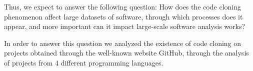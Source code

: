 Thus, we expect to answer the following question: How does the code cloning phenomenon affect large datasets of software, through which processes
does it appear, and more important can it impact large-scale software analysis works?

In order to answer this question we analyzed the existence of code cloning on projects obtained through the well-known website GitHub, through the
analysis of projects from 4 different programming languages.

